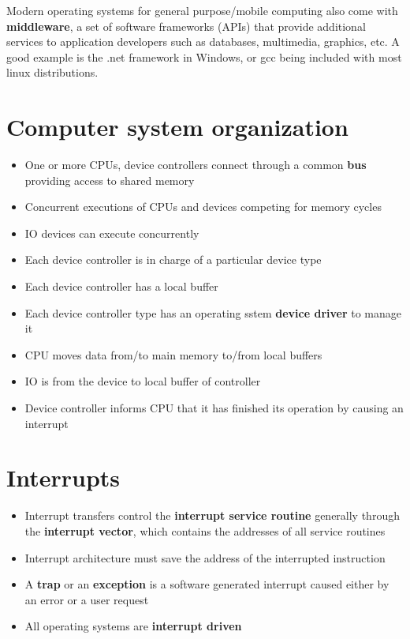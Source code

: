 \documentclass[12pt]{book}
\begin{document}
Modern operating systems for general purpose/mobile computing also come with \textbf{middleware}, a set of software frameworks (APIs) that provide additional services to application developers such as databases, multimedia, graphics, etc. A good example is the .net framework in Windows, or gcc being included with most linux distributions.

\section*{Computer system organization}

\begin{itemize}
    \item One or more CPUs, device controllers connect through a common \textbf{bus} providing access to shared memory
    \item Concurrent executions of CPUs and devices competing for memory cycles
    \item IO devices can execute concurrently
    \item Each device controller is in charge of a particular device type
    \item Each device controller has a local buffer
    \item Each device controller type has an operating sstem \textbf{device driver} to manage it
    \item CPU moves data from/to main memory to/from local buffers
    \item IO is from the device to local buffer of controller
    \item Device controller informs CPU that it has finished its operation by causing an interrupt
\end{itemize}

\section*{Interrupts}

\begin{itemize}
    \item Interrupt transfers control the \textbf{interrupt service routine} generally through the \textbf{interrupt vector}, which contains the addresses of all service routines
    \item Interrupt architecture must save the address of the interrupted instruction
    \item A \textbf{trap} or an \textbf{exception} is a software generated interrupt caused either by an error or a user request
    \item All operating systems are \textbf{interrupt driven}
\end{itemize}
\end{document}
